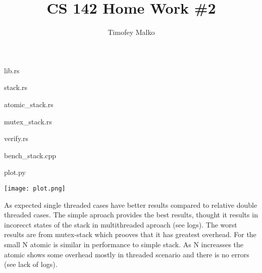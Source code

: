 \documentclass{article}
\title{CS 142 Home Work \#2}
\author{Timofey Malko}
\begin{document}
\maketitle
lib.rs


stack.rs


atomic\string_stack.rs


mutex\string_stack.rs


verify.rs


bench\string_stack.cpp


plot.py


\texttt{[image: plot.png]}

As expected single threaded cases have better results compared to relative double threaded cases. 
The simple aproach provides the best results, thought it results in incorecct states of the stack in multithreaded aproach (see logs).
The worst results are from mutex-stack which prooves that it has greatest overhead.
For the small N atomic is similar in performance to simple stack. As N increasses the atomic shows some overhead mostly in threaded scenario and there is no errors (see lack of logs).
\end{document}
